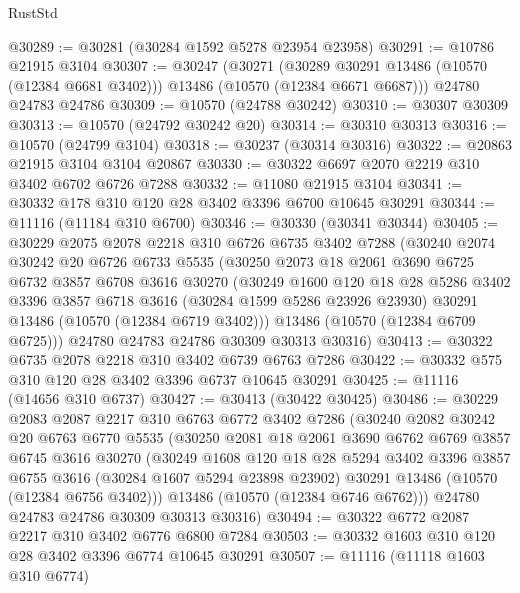 \begin{lexlean}{RustStd}
\begin{coremodule}
@30289 := @30281 (@30284 @1592 @5278 @23954 @23958)
@30291 := @10786 @21915 @3104
@30307 := @30247
    (@30271
      (@30289 @30291 @13486 (@10570 (@12384 @6681 @3402)))
      @13486
      (@10570 (@12384 @6671 @6687)))
    @24780
    @24783
    @24786
@30309 := @10570 (@24788 @30242)
@30310 := @30307 @30309
@30313 := @10570 (@24792 @30242 @20)
@30314 := @30310 @30313
@30316 := @10570 (@24799 @3104)
@30318 := @30237 (@30314 @30316)
@30322 := @20863 @21915 @3104 @3104 @20867
@30330 := @30322 @6697 @2070 @2219 @310 @3402 @6702 @6726 @7288
@30332 := @11080 @21915 @3104
@30341 := @30332 @178 @310 @120 @28 @3402 @3396 @6700 @10645 @30291
@30344 := @11116 (@11184 @310 @6700)
@30346 := @30330 (@30341 @30344)
@30405 := @30229
    @2075
    @2078
    @2218
    @310
    @6726
    @6735
    @3402
    @7288
    (@30240
      @2074
      @30242
      @20
      @6726
      @6733
      @5535
      (@30250
        @2073
        @18
        @2061
        @3690
        @6725
        @6732
        @3857
        @6708
        @3616
        @30270
        (@30249
          @1600
          @120
          @18
          @28
          @5286
          @3402
          @3396
          @3857
          @6718
          @3616
          (@30284 @1599 @5286 @23926 @23930)
          @30291
          @13486
          (@10570 (@12384 @6719 @3402)))
        @13486
        (@10570 (@12384 @6709 @6725)))
      @24780
      @24783
      @24786
      @30309
      @30313
      @30316)
@30413 := @30322 @6735 @2078 @2218 @310 @3402 @6739 @6763 @7286
@30422 := @30332 @575 @310 @120 @28 @3402 @3396 @6737 @10645 @30291
@30425 := @11116 (@14656 @310 @6737)
@30427 := @30413 (@30422 @30425)
@30486 := @30229
    @2083
    @2087
    @2217
    @310
    @6763
    @6772
    @3402
    @7286
    (@30240
      @2082
      @30242
      @20
      @6763
      @6770
      @5535
      (@30250
        @2081
        @18
        @2061
        @3690
        @6762
        @6769
        @3857
        @6745
        @3616
        @30270
        (@30249
          @1608
          @120
          @18
          @28
          @5294
          @3402
          @3396
          @3857
          @6755
          @3616
          (@30284 @1607 @5294 @23898 @23902)
          @30291
          @13486
          (@10570 (@12384 @6756 @3402)))
        @13486
        (@10570 (@12384 @6746 @6762)))
      @24780
      @24783
      @24786
      @30309
      @30313
      @30316)
@30494 := @30322 @6772 @2087 @2217 @310 @3402 @6776 @6800 @7284
@30503 := @30332 @1603 @310 @120 @28 @3402 @3396 @6774 @10645 @30291
@30507 := @11116 (@11118 @1603 @310 @6774)

\end{coremodule}
\end{lexlean}
